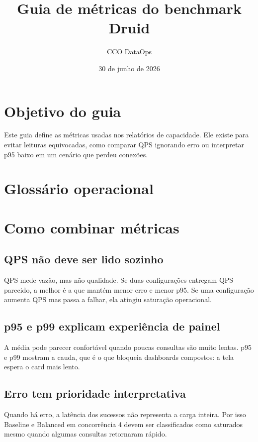 \documentclass[11pt,a4paper]{article}
\title{Guia de métricas do benchmark Druid}
\author{CCO DataOps}
\date{30 de junho de 2026}
\begin{document}
\maketitle


\section{Objetivo do guia}

Este guia define as métricas usadas nos relatórios de capacidade. Ele existe para evitar leituras equivocadas, como comparar QPS ignorando erro ou interpretar p95 baixo em um cenário que perdeu conexões.

\section{Glossário operacional}



\section{Como combinar métricas}

\subsection{QPS não deve ser lido sozinho}

QPS mede vazão, mas não qualidade. Se duas configurações entregam QPS parecido, a melhor é a que mantém menor erro e menor p95. Se uma configuração aumenta QPS mas passa a falhar, ela atingiu saturação operacional.

\subsection{p95 e p99 explicam experiência de painel}

A média pode parecer confortável quando poucas consultas são muito lentas. p95 e p99 mostram a cauda, que é o que bloqueia dashboards compostos: a tela espera o card mais lento.

\subsection{Erro tem prioridade interpretativa}

Quando há erro, a latência dos sucessos não representa a carga inteira. Por isso Baseline e Balanced em concorrência 4 devem ser classificados como saturados mesmo quando algumas consultas retornaram rápido.
\end{document}
